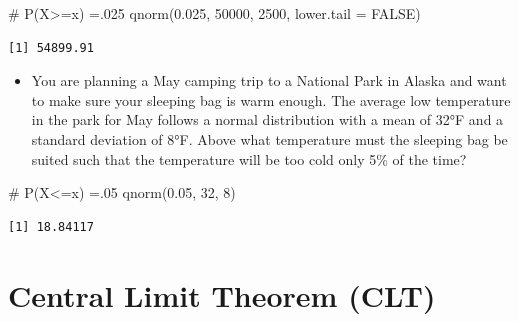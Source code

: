 \documentclass[
  letterpaper,
  DIV=11,
  numbers=noendperiod]{scrreprt}
\newenvironment{Shaded}{\begin{snugshade}}{\end{snugshade}}
\newcommand{\AttributeTok}[1]{\textcolor[rgb]{0.40,0.45,0.13}{#1}}
\newcommand{\CommentTok}[1]{\textcolor[rgb]{0.37,0.37,0.37}{#1}}
\newcommand{\ConstantTok}[1]{\textcolor[rgb]{0.56,0.35,0.01}{#1}}
\newcommand{\DecValTok}[1]{\textcolor[rgb]{0.68,0.00,0.00}{#1}}
\newcommand{\FloatTok}[1]{\textcolor[rgb]{0.68,0.00,0.00}{#1}}
\newcommand{\FunctionTok}[1]{\textcolor[rgb]{0.28,0.35,0.67}{#1}}
\newcommand{\NormalTok}[1]{\textcolor[rgb]{0.00,0.23,0.31}{#1}}
\providecommand{\tightlist}{%
  \setlength{\itemsep}{0pt}\setlength{\parskip}{0pt}}\usepackage{longtable,booktabs,array}
\begin{document}
\begin{Shaded}
\begin{Highlighting}[]
\CommentTok{\# P(X\textgreater{}=x) =.025}
\FunctionTok{qnorm}\NormalTok{(}\FloatTok{0.025}\NormalTok{, }\DecValTok{50000}\NormalTok{, }\DecValTok{2500}\NormalTok{, }\AttributeTok{lower.tail =} \ConstantTok{FALSE}\NormalTok{)}
\end{Highlighting}
\end{Shaded}

\begin{verbatim}
[1] 54899.91
\end{verbatim}

\begin{itemize}
\tightlist
\item
  You are planning a May camping trip to a National Park in Alaska and
  want to make sure your sleeping bag is warm enough. The average low
  temperature in the park for May follows a normal distribution with a
  mean of 32°F and a standard deviation of 8°F. Above what temperature
  must the sleeping bag be suited such that the temperature will be too
  cold only 5\% of the time?
\end{itemize}

\begin{Shaded}
\begin{Highlighting}[]
\CommentTok{\# P(X\textless{}=x) =.05}
\FunctionTok{qnorm}\NormalTok{(}\FloatTok{0.05}\NormalTok{, }\DecValTok{32}\NormalTok{, }\DecValTok{8}\NormalTok{)}
\end{Highlighting}
\end{Shaded}

\begin{verbatim}
[1] 18.84117
\end{verbatim}

\section{Central Limit Theorem (CLT)}\label{central-limit-theorem-clt}
\end{document}
